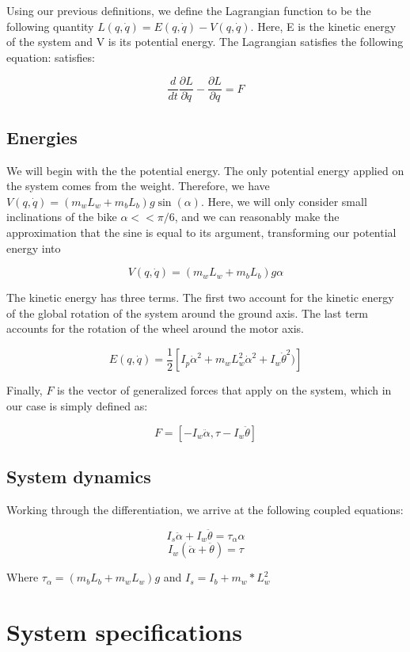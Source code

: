 \documentclass[11pt]{article}
\begin{document}
Using our previous definitions, we define the Lagrangian function to be the following quantity $L(q,\dot{q}) = E(q, \dot{q}) - V(q, \dot{q})$. Here, E is the kinetic energy of the system and V is its potential energy. The Lagrangian satisfies the following equation: satisfies:

$$ \frac{d}{dt}\frac{\partial L}{\partial \dot{q}} - \frac{\partial L}{\partial q} = F$$ 

\subsection{Energies}

We will begin with the the potential energy. The only potential energy applied on the system comes from the weight. Therefore, we have $V(q, \dot{q}) = (m_w L_w + m_b L_b)g\sin(\alpha)$. Here, we will only consider small inclinations of the bike $\alpha << \pi/6$, and we can reasonably make the approximation that the sine is equal to its argument, transforming our potential energy into 

$$V(q, \dot{q}) = (m_w L_w + m_b L_b)g\alpha$$

The kinetic energy has three terms. The first two account for the kinetic energy of the global rotation of the system around the ground axis. The last term accounts for the rotation of the wheel around the motor axis.

$$E(q, \dot{q}) = \frac{1}{2}\left[I_p \dot{\alpha}^2 + m_w L_w^2 \dot{\alpha}^2 + I_w \dot{\theta}^2)\right]$$

Finally, $F$ is the vector of generalized forces that apply on the system, which in our case is simply defined as:

$$F = [-I_w \ddot{\alpha}, \tau - I_w \ddot{\theta}]$$


\subsection{System dynamics}

Working through the differentiation, we arrive at the following coupled equations: 

$$I_s \ddot{\alpha} + I_w\ddot{\theta} = \tau_\alpha \alpha$$
$$I_w(\ddot{\alpha} + \ddot{\theta}) = \tau$$

Where $\tau_\alpha  = (m_b L_b + m_w L_w)g$ and $ I_s= I_b + m_w*L_w^2$


\section{System specifications}
\end{document}
